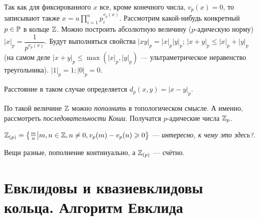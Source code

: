 \documentclass[a4paper]{report}
\begin{document}
    Так как для фиксированного $x$ все, кроме конечного числа, $v_p(x) = 0$, то записывают также $x = u \prod\limits_{i = 1}^{n}p_i^{v_p(x)}$.
    Рассмотрим какой-нибудь конкретный $p \in \P$ в кольце $\Z$.
    Можно построить абсолютную величину ($p$-адическую норму) $|x|_p = \dfrac{1}{p^{v_p(x)}}$.
    Будут выполняться свойства $|xy|_p = |x|_p|y|_p$; $|x + y|_p \le |x|_p + |y|_p$ (на самом деле $|x + y|_p \le \max(|x|_p, |y|_p)$ --- ультраметрическое неравенство треугольника).
    $|1|_p = 1; |0|_p = 0$.

    Расстояние в таком случае определяется $d_p(x, y) = |x - y|_p$.

    По такой величине $\Z$ можно \textit{пополнить} в топологическом смысле.
    А именно, рассмотреть \textit{последовательности Коши}.
    Получатся $p$-адические числа $\Z_p$.

    $\Z_{(p)} = \defset{\frac{m}{n}}{m, n \in \Z, n \ne 0, v_p(m) - v_p(n) \ge 0}$ --- \textit{интересно, к чему это здесь?}.

    Вещи разные, пополнение континуально, а $\Z_{(p)}$ --- счётно.


    \section{Евклидовы и квазиевклидовы кольца. Алгоритм Евклида}
\end{document}
